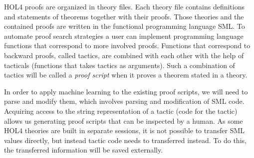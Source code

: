 \documentclass[runningheads,a4paper,draft]{svjour3}
\def\holfour{\textsf{HOL4}\xspace}
\def\sml{\textsf{SML}\xspace}
\def\polyml{\textsf{Poly/ML}\xspace}
\begin{document}
%
%
%

\holfour proofs are organized in theory files.
Each theory file contains definitions and statements of theorems together with
their proofs. Those theories and the contained proofs
are written
in the functional programming language \sml. To automate
proof search strategies a user can implement programming language functions
that correspond to more involved proofs.
Functions that correspond to backward proofs, called tactics, are combined with 
each other with the help of 
tacticals (functions that takes
tactics as arguments). Such a combination of tactics will be called a 
\emph{proof script} when it
proves a theorem stated in a theory.

In order to apply machine learning to the existing proof scripts, we will need 
to
parse and modify them, which involves parsing and modification of \sml code.
Acquiring access to the string representation of a tactic (code for the tactic) 
allows us generating
proof scripts that can be inspected by a human.
As some \holfour theories are built in separate sessions, it is not possible
to transfer \sml values directly, but instead tactic code needs to transferred 
instead.
To do this, the transferred information will be saved externally.
\end{document}
